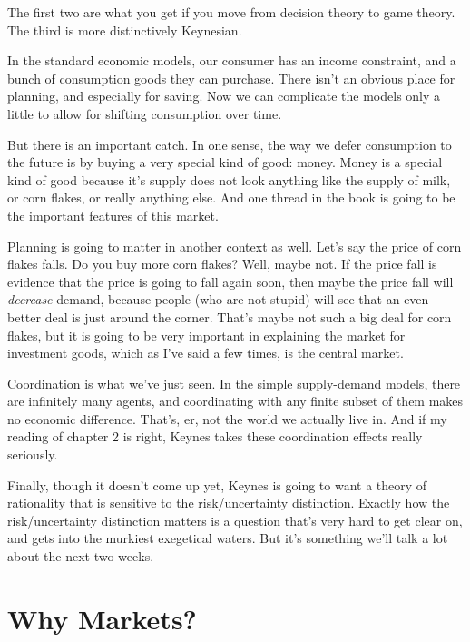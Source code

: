 \documentclass[
  11pt,
  letterpaper,
  DIV=11,
  numbers=noendperiod,
  oneside]{scrartcl}
\begin{document}
The first two are what you get if you move from decision theory to game
theory. The third is more distinctively Keynesian.

In the standard economic models, our consumer has an
income constraint, and a bunch of consumption goods they can purchase.
There isn't an obvious place for planning, and especially for saving.
Now we can complicate the models only a little to
allow for shifting consumption over time.

But there is an important catch. In one sense, the way we defer
consumption to the future is by buying a very special kind of good:
money. Money is a special kind of good because it's supply does not look
anything like the supply of milk, or corn flakes, or really anything
else. And one thread in the book is going to be the important features
of this market.

Planning is going to matter in another context as well. Let's say the
price of corn flakes falls. Do you buy more corn flakes? Well, maybe
not. If the price fall is evidence that the price is going to fall again
soon, then maybe the price fall will \emph{decrease} demand, because
people (who are not stupid) will see that an even better deal is just
around the corner. That's maybe not such a big deal for corn flakes, but
it is going to be very important in explaining the market for investment
goods, which as I've said a few times, is the central market.

Coordination is what we've just seen. In the simple supply-demand
models, there are infinitely many agents, and coordinating with any
finite subset of them makes no economic difference. That's, er, not the
world we actually live in. And if my reading of chapter 2 is right,
Keynes takes these coordination effects really seriously.

Finally, though it doesn't come up yet, Keynes is going to want a theory
of rationality that is sensitive to the risk/uncertainty distinction.
Exactly how the risk/uncertainty distinction matters is a question
that's very hard to get clear on, and gets into the murkiest exegetical
waters. But it's something we'll talk a lot about the next two weeks.

\section{Why Markets?}\label{why-markets}
\end{document}
